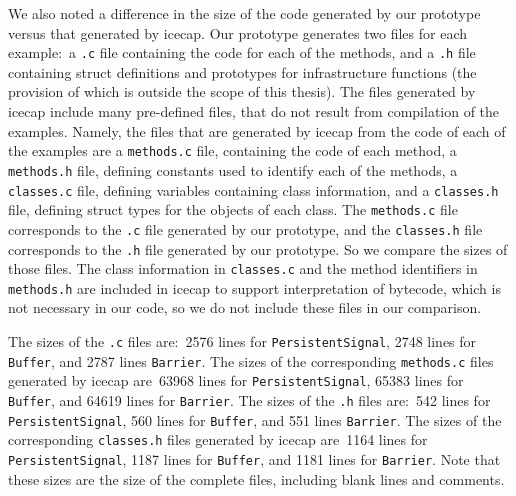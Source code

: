 {We also noted a difference in the size of the code generated by our
prototype versus that generated by icecap.
Our prototype generates two files for each example:~a \texttt{.c} file
containing the code for each of the methods, and a \texttt{.h} file
containing struct definitions and prototypes for infrastructure
functions (the provision of which is outside the scope of this
thesis).
The files generated by icecap include many pre-defined files, that do
not result from compilation of the examples.
Namely, the files that are generated by icecap from the code of each
of the examples are a \texttt{methods.c} file, containing the code of
each method, a \texttt{methods.h} file, defining constants used to
identify each of the methods, a \texttt{classes.c} file, defining
variables containing class information, and a \texttt{classes.h} file,
defining struct types for the objects of each class.
The \texttt{methods.c} file corresponds to the \texttt{.c} file
generated by our prototype, and the \texttt{classes.h} file
corresponds to the \texttt{.h} file generated by our prototype. 
So we compare the sizes of those files.
The class information in \texttt{classes.c} and the method identifiers
in \texttt{methods.h} are included in icecap to support interpretation
of bytecode, which is not necessary in our code, so we do not include
these files in our comparison.

The sizes of the \texttt{.c} files are:~2576 lines for
\texttt{PersistentSignal}, 2748 lines for \texttt{Buffer}, and 2787
lines \texttt{Barrier}.
The sizes of the corresponding \texttt{methods.c} files generated by
icecap are~63968 lines for \texttt{PersistentSignal}, 65383 lines for
\texttt{Buffer}, and 64619 lines for \texttt{Barrier}.
The sizes of the \texttt{.h} files are:~542 lines for
\texttt{PersistentSignal}, 560 lines for \texttt{Buffer}, and 551
lines \texttt{Barrier}.
The sizes of the corresponding \texttt{classes.h} files generated by
icecap are~1164 lines for \texttt{PersistentSignal}, 1187 lines for
\texttt{Buffer}, and 1181 lines for \texttt{Barrier}.
Note that these sizes are the size of the complete files, including
blank lines and comments.

}

